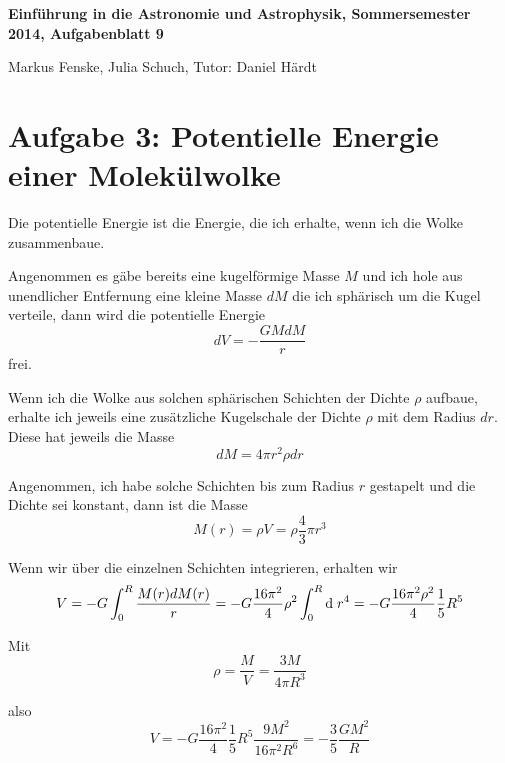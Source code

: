 \documentclass[a4paper,german,12pt,smallheadings]{scrartcl}
\begin{document}
\allowdisplaybreaks %
\begin{center}
\bfseries %
\sffamily %
\vspace{-40pt}
Einführung in die Astronomie und Astrophysik, Sommersemester 2014, Aufgabenblatt 9

Markus Fenske, Julia Schuch, Tutor: Daniel Härdt
\vspace{-10pt}
\end{center}
\section*{Aufgabe 3: Potentielle Energie einer Molekülwolke}
Die potentielle Energie ist die Energie, die ich erhalte, wenn ich die Wolke
zusammenbaue.

Angenommen es gäbe bereits eine kugelförmige Masse $M$ und ich hole aus
unendlicher Entfernung eine kleine Masse $dM$ die ich sphärisch um die Kugel
verteile, dann wird die potentielle Energie
\begin{equation}
  dV = - \frac{G M dM}{r}
\end{equation}
frei.

Wenn ich die Wolke aus solchen sphärischen Schichten der Dichte $\rho$ aufbaue,
erhalte ich jeweils eine zusätzliche Kugelschale der Dichte $\rho$ mit dem
Radius $dr$. Diese hat jeweils die Masse
\begin{equation}
  dM = 4 \pi r^2 \rho dr
\end{equation}

Angenommen, ich habe solche Schichten bis zum Radius $r$ gestapelt und die
Dichte sei konstant, dann ist die Masse
\begin{equation}
  M(r) = \rho V = \rho \frac{4}{3} \pi r^3
\end{equation}

Wenn wir über die einzelnen Schichten integrieren, erhalten wir
\begin{equation}
  V = -G \int_0^R \frac{M(r) dM(r)}{r} = -G \frac{16 \pi^2}{4} \rho^2 \int_0^R \dif \; r^4 = -G\frac{16 \pi^2 \rho^2}{4} \frac{1}{5} R^5
\end{equation}

Mit
\begin{equation}
  \rho = \frac{M}{V} = \frac{3 M}{4 \pi R^3}
\end{equation}

also
\begin{equation}
  V = -G \frac{16 \pi^2}{4} \frac{1}{5} R^5 \frac{9 M^2}{16\pi^2 R^6} = - \frac{3}{5} \frac{G M^2}{R}
\end{equation}
\end{document}
